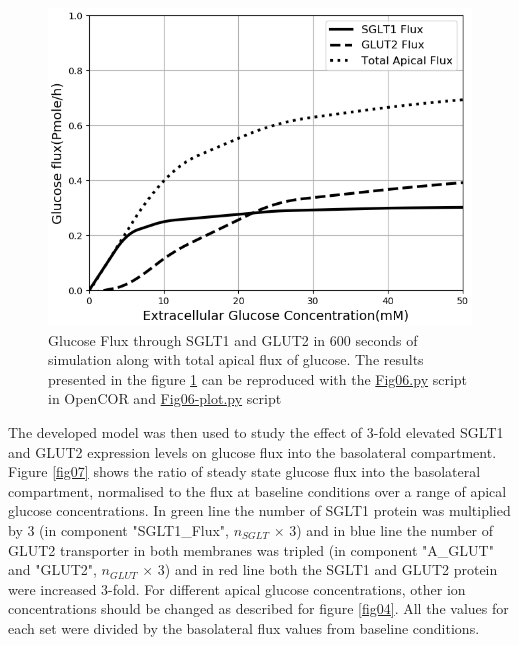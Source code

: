 \documentclass[fleqn,10pt]{physiome}
\begin{document}
\begin{figure}[ht]
\centering
\includegraphics[width=0.7\linewidth]{fig06.png}
\caption{Glucose Flux through SGLT1 and GLUT2 in $600$ seconds of simulation along with total apical flux of glucose. The results presented in the figure \ref{fig06} can be reproduced with the \href{https://models.physiomeproject.org/workspace/572/file/c052b0c460280139dad150937fbee4fa6a026505/SEDML_files/Fig06.py}{Fig06.py} script in OpenCOR and \href{https://models.physiomeproject.org/workspace/572/file/c052b0c460280139dad150937fbee4fa6a026505/SEDML_files/Fig06_plot.py}{Fig06-plot.py} script}
\label{fig06}
\end{figure}

The developed model was then used to study the effect of 3-fold elevated SGLT1 and GLUT2 expression levels on glucose flux into the basolateral compartment. Figure \ref{fig07} shows the ratio of steady state glucose flux into the basolateral compartment, normalised to the flux at baseline conditions over a range of apical glucose concentrations. In green line the number of SGLT1 protein was multiplied by 3 (in component "SGLT1\_Flux", $n_{SGLT}$ $\times$ $3$) and in blue line the number of GLUT2 transporter in both membranes was tripled (in component "A\_GLUT" and "GLUT2", $n_{GLUT}$ $\times$ $3$) and in red line both the SGLT1 and GLUT2 protein were increased 3-fold. For different apical glucose concentrations, other ion concentrations should be changed as described for figure \ref{fig04}. All the values for each set were divided by the basolateral flux values from baseline conditions.\newpage
\end{document}
